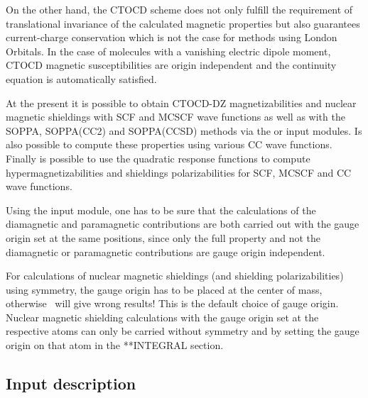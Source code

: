 On the other hand, the CTOCD scheme does not only fulfill the requirement of
translational invariance of the calculated magnetic properties but also
guarantees current-charge conservation which is not the case for methods using
London Orbitals. In the case of molecules with a vanishing electric dipole
moment, CTOCD magnetic susceptibilities are origin independent and the
continuity equation is automatically satisfied.

At the present it is possible to obtain CTOCD-DZ magnetizabilities and
nuclear magnetic shieldings with SCF and MCSCF wave functions as well
as with the SOPPA, SOPPA(CC2) and SOPPA(CCSD) methods via the
 or  input modules. Is also possible to
compute these properties using various CC wave functions. Finally is
possible to use the quadratic response functions to compute
hypermagnetizabilities and shieldings polarizabilities for SCF, MCSCF
and CC wave functions.

Using the  input module, one has to be sure that the
calculations of the diamagnetic and paramagnetic contributions are both
carried out with the gauge origin set at the same positions, since only
the full property and not the diamagnetic or paramagnetic contributions
are gauge origin independent.

For calculations of nuclear magnetic shieldings (and shielding
polarizabilities) using symmetry, the gauge origin has to be placed at the
center of mass, otherwise \dalton\ will give wrong results! This is the
default choice of gauge origin. Nuclear magnetic
shielding calculations with the gauge origin set at the respective atoms can
only be carried without symmetry and by setting the gauge origin on that atom
in the **INTEGRAL section.

\subsection{Input description}\label{sec:ctocdinput}

